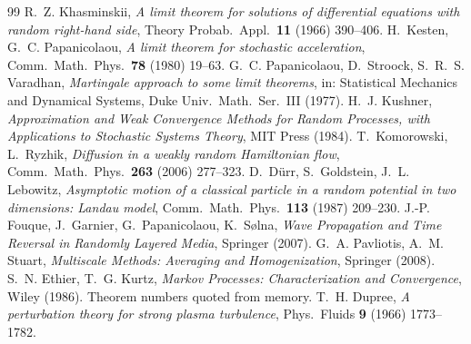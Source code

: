 \documentclass[11pt]{article}
\theoremstyle{remark}
\begin{document}
\begin{thebibliography}{99}
\small
{} R.~Z. Khasminskii, \emph{A limit theorem for solutions of
differential equations with random right-hand side}, Theory Probab.\ Appl.\
\textbf{11} (1966) 390--406.
 H.~Kesten, G.~C. Papanicolaou, \emph{A limit theorem for
stochastic acceleration}, Comm.\ Math.\ Phys.\ \textbf{78} (1980) 19--63.
\bibitem{PSV} G.~C. Papanicolaou, D.~Stroock, S.~R.~S. Varadhan,
\emph{Martingale approach to some limit theorems}, in: Statistical Mechanics
and Dynamical Systems, Duke Univ.\ Math.\ Ser.\ III (1977).
 H.~J. Kushner, \emph{Approximation and Weak Convergence
Methods for Random Processes, with Applications to Stochastic Systems
Theory}, MIT Press (1984).
 T.~Komorowski, L.~Ryzhik, \emph{Diffusion in a weakly random
Hamiltonian flow}, Comm.\ Math.\ Phys.\ \textbf{263} (2006) 277--323.
\bibitem{DGL} D.~D\"urr, S.~Goldstein, J.~L. Lebowitz, \emph{Asymptotic
motion of a classical particle in a random potential in two dimensions:
Landau model}, Comm.\ Math.\ Phys.\ \textbf{113} (1987) 209--230.
\bibitem{FGPS} J.-P. Fouque, J.~Garnier, G.~Papanicolaou, K.~S{\o}lna,
\emph{Wave Propagation and Time Reversal in Randomly Layered Media},
Springer (2007).
 G.~A. Pavliotis, A.~M. Stuart, \emph{Multiscale Methods:
Averaging and Homogenization}, Springer (2008).
 S.~N. Ethier, T.~G. Kurtz, \emph{Markov Processes:
Characterization and Convergence}, Wiley (1986). Theorem numbers quoted from
memory.
 T.~H. Dupree, \emph{A perturbation theory for strong plasma
turbulence}, Phys.\ Fluids \textbf{9} (1966) 1773--1782.
\end{thebibliography}
\end{document}
